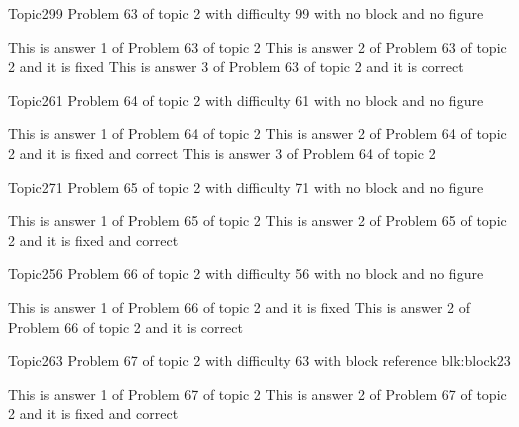 \documentclass[master]{exam}
\begin{document}
\begin{problem}{Topic2}{99}
	Problem 63 of topic 2 with difficulty 99 with no block and no figure
	\begin{answers}
		\answer This is answer 1 of Problem 63 of topic 2 
		\answer[fixed] This is answer 2 of Problem 63 of topic 2 and it is fixed
		\answer[correct] This is answer 3 of Problem 63 of topic 2 and it is correct
	\end{answers}
\end{problem}

\begin{problem}{Topic2}{61}
	Problem 64 of topic 2 with difficulty 61 with no block and no figure
	\begin{answers}
		\answer This is answer 1 of Problem 64 of topic 2 
		 This is answer 2 of Problem 64 of topic 2 and it is fixed and correct
		\answer This is answer 3 of Problem 64 of topic 2 
	\end{answers}
\end{problem}

\begin{problem}{Topic2}{71}
	Problem 65 of topic 2 with difficulty 71 with no block and no figure
	\begin{answers}
		\answer This is answer 1 of Problem 65 of topic 2 
		 This is answer 2 of Problem 65 of topic 2 and it is fixed and correct
	\end{answers}
\end{problem}

\begin{problem}{Topic2}{56}
	Problem 66 of topic 2 with difficulty 56 with no block and no figure
	\begin{answers}
		\answer[fixed] This is answer 1 of Problem 66 of topic 2 and it is fixed
		\answer[correct] This is answer 2 of Problem 66 of topic 2 and it is correct
	\end{answers}
\end{problem}

\begin{problem}[requires=blk:block23]{Topic2}{63}
	Problem 67 of topic 2 with difficulty 63 with block reference blk:block23
	\begin{answers}
		\answer This is answer 1 of Problem 67 of topic 2 
		 This is answer 2 of Problem 67 of topic 2 and it is fixed and correct
	\end{answers}
\end{problem}
\end{document}
